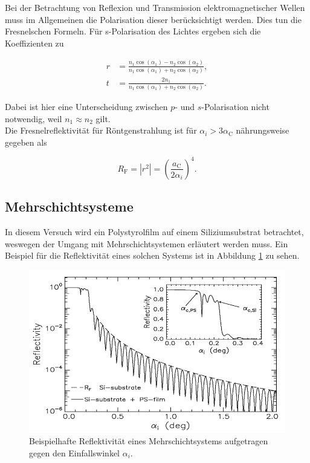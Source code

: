 Bei der Betrachtung von Reflexion und Transmission elektromagnetischer Wellen muss im Allgemeinen die Polarisation dieser 
berücksichtigt werden. Dies tun die Fresnelschen Formeln. Für s-Polarisation des Lichtes ergeben sich die Koeffizienten zu 

\begin{align*}
    r &= \frac{n_1 \cos{\left(\alpha_1\right)}-n_2 \cos{\left(\alpha_2\right)}}{n_1 \cos{\left(\alpha_1\right)}+n_2 \cos{\left(\alpha_2\right)}},\\
    t &= \frac{2n_1}{n_1 \cos{\left(\alpha_1\right)}+n_2 \cos{\left(\alpha_2\right)}}.
\end{align*}

Dabei ist hier eine Unterscheidung zwischen $p$- und $s$-Polarisation nicht notwendig, weil $n_1 \approx n_2$ gilt.\\
Die Fresnelreflektivität für Röntgenstrahlung ist für $\alpha_i > 3\alpha_\text{C}$ nährungsweise gegeben als

\begin{equation*}
    R_\text{F} = |r^2| = \left(\frac{a_\text{C}}{2\alpha_i}\right)^4.
\end{equation*}

\subsection{Mehrschichtsysteme}

In diesem Versuch wird ein Polystyrolfilm auf einem Siliziumsubstrat betrachtet, weswegen der Umgang mit Mehrschichtsystemen 
erläutert werden muss. Ein Beispiel für die Reflektivität eines solchen Systems ist in Abbildung \ref{fig:mss} zu sehen. 

\begin{figure}
  \centering
  \includegraphics[scale=0.4]{content/mehrschichtsys.png}
  \caption{Beispielhafte Reflektivität eines Mehrschichtsystems aufgetragen gegen den Einfallswinkel $\alpha_i$.\cite{Anleitungalt}}
  \label{fig:mss}
\end{figure}

